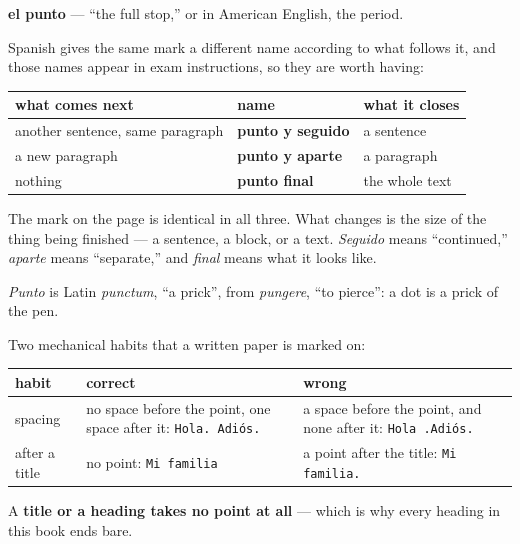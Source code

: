 \begin{cousinweb}
\textbf{el punto} — \textquotedblleft{}the full stop,\textquotedblright{} or in American English, the period.

Spanish gives the same mark a different name according to what follows it, and those names appear in exam instructions, so they are worth having:

\noindent
\begin{tabularx}{\linewidth}{@{}>{\raggedright\arraybackslash}X>{\raggedright\arraybackslash}X>{\raggedright\arraybackslash}X@{}}
\toprule
\textbf{what comes next} & \textbf{name} & \textbf{what it closes} \\
\midrule
another sentence, same paragraph & \textbf{punto y seguido} & a sentence \\
a new paragraph & \textbf{punto y aparte} & a paragraph \\
nothing & \textbf{punto final} & the whole text \\
\bottomrule
\end{tabularx}

The mark on the page is identical in all three. What changes is the size of the thing being finished — a sentence, a block, or a text. \emph{Seguido} means \textquotedblleft{}continued,\textquotedblright{} \emph{aparte} means \textquotedblleft{}separate,\textquotedblright{} and \emph{final} means what it looks like.

\emph{Punto} is Latin \emph{punctum}, \textquotedblleft{}a prick\textquotedblright{}, from \emph{pungere}, \textquotedblleft{}to pierce\textquotedblright{}: a dot is a prick of the pen.
\end{cousinweb}

\begin{grammarlens}[title={Grammar Lens: spacing, and the one place the mark is left off}]
Two mechanical habits that a written paper is marked on:

\noindent
\begin{tabularx}{\linewidth}{@{}>{\raggedright\arraybackslash}X>{\raggedright\arraybackslash}X>{\raggedright\arraybackslash}X@{}}
\toprule
\textbf{habit} & \textbf{correct} & \textbf{wrong} \\
\midrule
spacing & no space before the point, one space after it: \texttt{Hola. Adiós.} & a space before the point, and none after it: \texttt{Hola .Adiós.} \\
after a title & no point: \texttt{Mi familia} & a point after the title: \texttt{Mi familia.} \\
\bottomrule
\end{tabularx}

A \textbf{title or a heading takes no point at all} — which is why every heading in this book ends bare.
\end{grammarlens}

